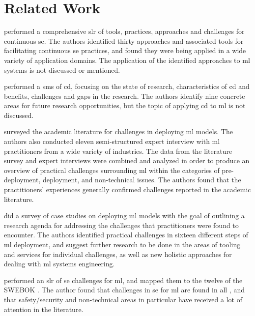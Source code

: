 \chapter{Related Work}
\label{ch:related_work}

\textcite{Shahin2017} performed a comprehensive \acrfull{slr} of tools, practices, approaches and challenges for continuous \acrshort{se}.
The authors identified thirty approaches and associated tools for facilitating continuous \acrshort{se} practices, and found they were being applied in a wide variety of application domains.
The application of the identified approaches to \acrshort{ml} systems is not discussed or mentioned.

\textcite{Rodriguez2017} performed a \acrfull{sms} of \acrfull{cd}, focusing on the state of research, characteristics of \acrshort{cd} and benefits, challenges and gaps in the research.
The authors identify nine concrete areas for future research opportunities, but the topic of applying \acrshort{cd} to \acrshort{ml} is not discussed.

\textcite{Baier2019} surveyed the academic literature for challenges in deploying \acrshort{ml} models.
The authors also conducted eleven semi-structured expert interview with \acrshort{ml} practitioners from a wide variety of industries.
The data from the literature survey and expert interviews were combined and analyzed in order to produce an overview of practical challenges surrounding \acrshort{ml} within the categories of pre-deployment, deployment, and non-technical issues.
The authors found that the practitioners' experiences generally confirmed challenges reported in the academic literature.

\textcite{Paleyes2020} did a survey of case studies on deploying \acrshort{ml} models with the goal of outlining a research agenda for addressing the challenges that practitioners were found to encounter.
The authors identified practical challenges in sixteen different steps of \acrshort{ml} deployment, and suggest further research to be done in the areas of tooling and services for individual challenges, as well as new holistic approaches for dealing with \acrshort{ml} systems engineering.

\textcite{Kumeno2020} performed an \acrshort{slr} of \acrshort{se} challenges for \acrshort{ml}, and mapped them to the twelve  of the SWEBOK \cite{Bourque2014}.
The author found that challenges in \acrshort{se} for \acrshort{ml} are found in all , and that safety/security and non-technical areas in particular have received a lot of attention in the literature.

